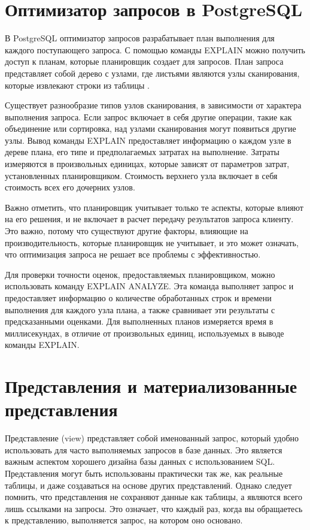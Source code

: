 \documentclass{bmstu}
\begin{document}
\section{Оптимизатор запросов в PostgreSQL}
В PostgreSQL оптимизатор запросов разрабатывает план выполнения для каждого поступающего запроса. С помощью команды EXPLAIN можно получить доступ к планам, которые планировщик создает для запросов. План запроса представляет собой дерево с узлами, где листьями являются узлы сканирования, которые извлекают строки из таблицы \cite{fifthOptSQL}.

Существует разнообразие типов узлов сканирования, в зависимости от характера выполнения запроса. Если запрос включает в себя другие операции, такие как объединение или сортировка, над узлами сканирования могут появиться другие узлы. Вывод команды EXPLAIN предоставляет информацию о каждом узле в дереве плана, его типе и предполагаемых затратах на выполнение. Затраты измеряются в произвольных единицах, которые зависят от параметров затрат, установленных планировщиком. Стоимость верхнего узла включает в себя стоимость всех его дочерних узлов.

Важно отметить, что планировщик учитывает только те аспекты, которые влияют на его решения, и не включает в расчет передачу результатов запроса клиенту. Это важно, потому что существуют другие факторы, влияющие на производительность, которые планировщик не учитывает, и это может означать, что оптимизация запроса не решает все проблемы с эффективностью.

Для проверки точности оценок, предоставляемых планировщиком, можно использовать команду EXPLAIN ANALYZE. Эта команда выполняет запрос и предоставляет информацию о количестве обработанных строк и времени выполнения для каждого узла плана, а также сравнивает эти результаты с предсказанными оценками. Для выполненных планов измеряется время в миллисекундах, в отличие от произвольных единиц, используемых в выводе команды EXPLAIN.

\section{Представления и материализованные представления}

Представление (view) представляет собой именованный запрос, который удобно использовать для часто выполняемых запросов в базе данных. Это является важным аспектом хорошего дизайна базы данных с использованием SQL. Представления могут быть использованы практически так же, как реальные таблицы, и даже создаваться на основе других представлений. Однако следует помнить, что представления не сохраняют данные как таблицы, а являются всего лишь ссылками на запросы. Это означает, что каждый раз, когда вы обращаетесь к представлению, выполняется запрос, на котором оно основано.
\end{document}
